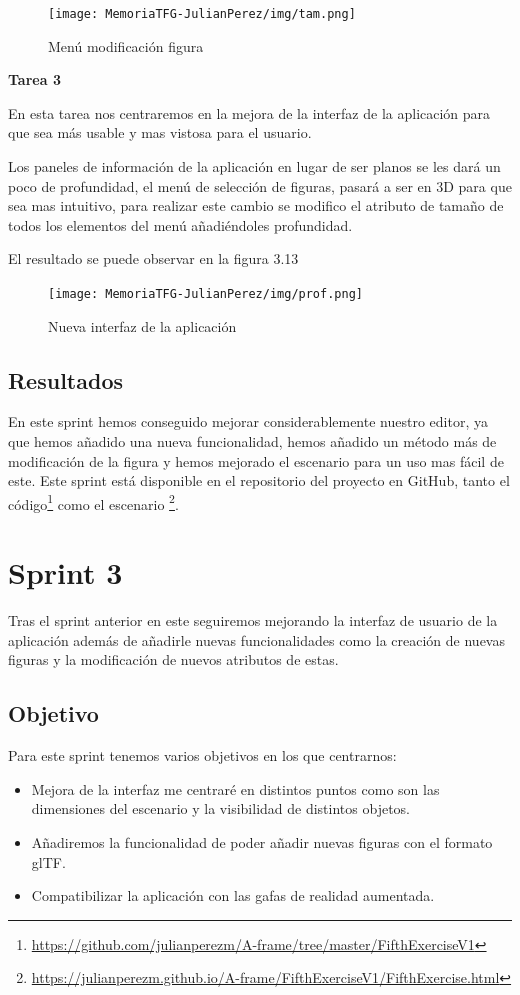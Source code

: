 \documentclass[a4paper, 12pt]{book}
\begin{document}
\begin{figure}[H]
  \centering
  \texttt{[image: MemoriaTFG-JulianPerez/img/tam.png]}
  \caption{Menú modificación figura}\label{scrum}
\end{figure}

\textbf{Tarea 3}

En esta tarea nos centraremos en la mejora de la interfaz de la aplicación para que sea más usable y mas vistosa para el usuario. 

Los paneles de información de la aplicación en lugar de ser planos se les dará un poco de profundidad, el menú de selección de figuras, pasará a ser en 3D para que sea mas intuitivo, para realizar este cambio se modifico el atributo de tamaño de todos los elementos del menú añadiéndoles profundidad.

El resultado se puede observar en la figura 3.13

\begin{figure}[H]
  \centering
  \texttt{[image: MemoriaTFG-JulianPerez/img/prof.png]}
  \caption{Nueva interfaz de la aplicación}\label{scrum}
\end{figure}

\subsection{Resultados}

En este sprint hemos conseguido mejorar considerablemente nuestro editor, ya que hemos añadido una nueva funcionalidad, hemos añadido un método más de modificación de la figura y hemos mejorado el escenario para un uso mas fácil de este. Este sprint está disponible en el repositorio del proyecto en GitHub, tanto el código\footnote{\url{https://github.com/julianperezm/A-frame/tree/master/FifthExerciseV1}} como el escenario \footnote{\url{https://julianperezm.github.io/A-frame/FifthExerciseV1/FifthExercise.html}}.


\section{Sprint 3}

Tras el sprint anterior en este seguiremos mejorando la interfaz de usuario de la aplicación además de añadirle nuevas funcionalidades como la creación de nuevas figuras y la modificación de nuevos atributos de estas.

\subsection{Objetivo}
Para este sprint tenemos varios objetivos en los que centrarnos:
\begin{itemize}
    \item Mejora de la interfaz me centraré en distintos puntos como son las dimensiones del escenario y la visibilidad de distintos objetos.
    \item Añadiremos la funcionalidad de poder añadir nuevas figuras con el formato glTF.
    \item Compatibilizar la aplicación con las gafas de realidad aumentada.
\end{itemize}
\end{document}

